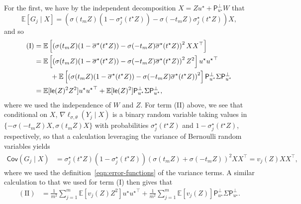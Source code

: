 \documentclass[11pt]{article}
\newcommand{\cov}{\mathsf{Cov}}
\newcommand{\E}{\mathbb{E}}
\newcommand{\wb}[1]{\overline{#1}}
\newcommand{\proj}{\mathsf{P}}
\newcommand{\projperp}{\proj_{u\opt}^\perp}
\newcommand{\loss}{\ell}
\newcommand{\<}{\langle} %
\renewcommand{\>}{\rangle}
\newcommand{\opt}{^\star}
\begin{document}
For the first, we have by the independent decomposition
$X = Z u\opt + \projperp W$ that
\begin{equation*}
	\E[G_j \mid X]
	= 
	\left(\sigma(t_m Z)
	(1 - \sigma_j\opt(t\opt Z))
	- \sigma(- t_m Z) \sigma_j\opt(t\opt Z)\right)
	X,
\end{equation*}
and so
\begin{align*}
	\mathrm{(I)} & =
	\E\left[\left(\sigma(t_m Z) (1 - \wb{\sigma}\opt(t\opt Z))
	- \sigma(-t_m Z) \wb{\sigma}\opt(t\opt Z)\right)^2 XX^\top \right] \\
	& =
	\E\left[\left(\sigma(t_m Z) (1 - \wb{\sigma}\opt(t\opt Z))
	- \sigma(-t_m Z) \wb{\sigma}\opt(t\opt Z)\right)^2 Z^2 \right]
	u\opt {u\opt}^\top
	\\ & \qquad ~ + 
	\E\left[\left(\sigma(t_m Z) (1 - \wb{\sigma}\opt(t\opt Z))
	- \sigma(-t_m Z) \wb{\sigma}\opt(t\opt Z)\right)^2\right]
	\projperp \Sigma \projperp \\
	& = \E[\linkerr(Z)^2 Z^2] u\opt {u\opt}^\top
	+ \E[\linkerr(Z)^2]   \projperp \Sigma \projperp,
\end{align*}
where we used the independence of $W$ and $Z$.
For term (II) above, we see that conditional on $X$,
$\nabla \loss_{\sigma,\theta}(Y_j \mid X)$ is a binary
random variable taking values in
$\{-\sigma(-t_m Z) X, \sigma(t_m Z) X\}$ with probabilities
$\sigma_j\opt(t\opt Z)$ and
$1 - \sigma_j\opt(t\opt Z)$, respectively, so that
a calculation leveraging the variance of Bernoulli random variables
yields
\begin{align*}
	\cov(G_j \mid X)
	& = \sigma_j\opt(t\opt Z) (1 - \sigma_j\opt(t\opt Z))
	\left(\sigma(t_m Z) + \sigma(-t_m Z)\right)^2 XX^\top
	= v_j(Z) XX^\top,
\end{align*}
where we used the definition~\eqref{eqn:error-functions} of the
variance terms.
A similar calculation to that we used for term (I) then gives that
\begin{align*}
	\mathrm{(II)} & = \frac{1}{m^2}
	\sum_{j = 1}^m \E[v_j(Z) Z^2] u\opt {u\opt}^\top
	+ \frac{1}{m^2}
	\sum_{j = 1}^m \E[v_j(Z)] \projperp \Sigma \projperp.
\end{align*}
\end{document}
